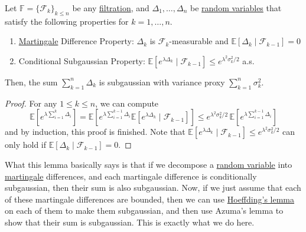   \begin{lemma}[Azuma]
    \label{thm:azuma}
  Let $\mathbb{F} = \{\mathcal{F}_k\}_{k \leq n}$ be any \hyperref[sp-def:filtration]{filtration}, and $\Delta_1, \ldots, \Delta_n$ be \hyperref[prob-def:random-variable]{random variables} that satisfy the following properties for $k = 1, \ldots, n$. 
  \begin{enumerate}
      \item \hyperref[sp-def:martingale]{Martingale} Difference Property: $\Delta_k$ is $\mathcal{F}_k$-measurable and $\mathbb{E}[\Delta_k \mid \mathcal{F}_{k-1}] = 0$ 
      \item Conditional Subgaussian Property: $\mathbb{E}[e^{\lambda \Delta_k} \mid \mathcal{F}_{k-1}] \leq e^{\lambda^2 \sigma^2_k / 2}$ a.s. 
  \end{enumerate}
  Then, the sum $\sum_{k=1}^n \Delta_k$ is subgaussian with variance proxy $\sum_{k=1}^n \sigma_k^2$. 
  \end{lemma}
  \begin{proof}
  For any $1 \leq k \leq n$, we can compute 
  \begin{equation}
    \mathbb{E}[ e^{\lambda \sum_{i=1}^k \Delta_i} ] = \mathbb{E}[e^{\lambda \sum_{i=1}^{k-1} \Delta_i} \mathbb{E}[e^{\lambda \Delta_k} \mid \mathcal{F}_{k-1}]] \leq e^{\lambda^2 \sigma_k^2 / 2} \, \mathbb{E}[e^{\lambda \sum_{i=1}^{k-1} \Delta_i}]
  \end{equation}
  and by induction, this proof is finished. Note that $\mathbb{E}[e^{\lambda \Delta_k} \mid \mathcal{F}_{k-1}] \leq e^{\lambda^2 \sigma^2_k / 2}$ can only hold if $\mathbb{E}[\Delta_k \mid \mathcal{F}_{k-1}] = 0$. 
  \end{proof}

  What this lemma basically says is that if we decompose a \hyperref[prob-def:random-variable]{random variable} into \hyperref[sp-def:martingale]{martingale} differences, and each martingale difference is conditionally subgaussian, then their sum is also subgaussian. Now, if we just assume that each of these martingale differences are bounded, then we can use \hyperref[thm:hoeffdings-lemma]{Hoeffding's lemma} on each of them to make them subgaussian, and then use Azuma's lemma to show that their sum is subgaussian. This is exactly what we do here. 

